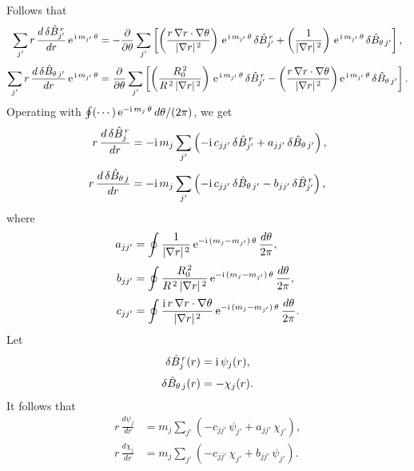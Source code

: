 \documentclass[notitlepage,12pt]{article}
\begin{document}
Follows that
\begin{align}
\sum_{j'} r\,\frac{d\,\delta \hat{B}^{\,r}_{j'}}{dr}\,{\rm e}^{\,{\rm i}\,m_{j'}\,\theta}&=-\frac{\partial}{\partial\theta}\sum_{j'} \left[\left(\frac{r\,\nabla r\cdot\nabla \theta}{|\nabla r|^{\,2}}\right)\,{\rm e}^{\,{\rm i}\,m_{j'}\,\theta}\,\delta \hat{B}^{\,r}_{j'} +\left(\frac{1}{|\nabla r|^{\,2}}\right)\,{\rm e}^{\,{\rm i}\,m_{j'}\,\theta}\,\delta \hat{B}_{\theta\,j'}\right],\\[0.5ex]
\sum_{j'} r\,\frac{d\,\delta \hat{B}_{\theta\,j'}}{dr}\,{\rm e}^{\,{\rm i}\,m_{j'}\,\theta}
&= \frac{\partial}{\partial\theta}\sum_{j'}\left[\left(\frac{R_0^{\,2}}{R^{\,2}\,|\nabla r|^{\,2}}\right)\,{\rm e}^{\,{\rm i}\,m_{j'}\,\theta}\,\delta \hat{B}^{\,r}_{j'}
-\left(\frac{r\,\nabla r\cdot\nabla\theta}{|\nabla r|^{\,2}}\right){\rm e}^{\,{\rm i}\,m_{j'}\,\theta}\,\delta \hat{B}_{\theta\,j'}\right].
\end{align}
Operating with $\oint(\cdots)\, {\rm e}^{-{\rm i}\,m_j\,\theta}\,d\theta/(2\pi)$, we
get
\begin{align}
r\,\frac{d\,\delta \hat{B}_j^{\,r}}{dr}
&= -{\rm i}\,m_j\sum_{j'}\left(-{\rm i}\,c_{jj'}\,\delta \hat{B}_{j'}^{\,r}
+a_{jj'}\,\delta \hat{B}_{\theta\,j'}\right),\\[0.5ex]
r\,\frac{d\,\delta \hat{B}_{\theta\,j}}{dr}
&= -{\rm i}\,m_j\sum_{j'}\left(-{\rm i}\,c_{jj'}\,\delta \hat{B}_{\theta\,j'}
-b_{jj'}\,\delta \hat{B}_{j'}^{\,r}\right),
\end{align}
where
\begin{align}
a_{jj'} &= \oint \frac{1}{|\nabla r|^{\,2}}\,
{\rm e}^{-{\rm i}\,(m_j-m_{j'})\,\theta}
\,\frac{d\theta}{2\pi},\\[0.5ex]
b_{jj'}& = \oint \frac{R_0^{\,2}}{R^{\,2}\,|\nabla r|^{\,2}}\,
{\rm e}^{-{\rm i}\,(m_j-m_{j'})\,\theta}
\,\frac{d\theta}{2\pi},\\[0.5ex]
c_{jj'} &= \oint \frac{{\rm i}\,r\,\nabla r\cdot\nabla \theta}{|\nabla r|^{\,2}}\,
{\rm e}^{-{\rm i}\,(m_j-m_{j'})\,\theta}
\,\frac{d\theta}{2\pi}.
\end{align}
Let
\begin{align}
\delta \hat{B}_{j}^{\,r}(r) &={\rm i}\,\psi_j(r),\\[0.5ex]
\delta \hat{B}_{\theta\,j}(r)&= -\chi_j(r).
\end{align}
It follows that
\begin{align}
r\,\frac{d\psi_j}{dr} &=m_j\sum_{j'}\left(-c_{jj'}\,\psi_{j'} + a_{jj'}\,\chi_{j'}\right),\\[0.5ex]
r\,\frac{d\chi_j}{dr} &=m_j\sum_{j'}\left(-c_{jj'}\,\chi_{j'} + b_{jj'}\,\psi_{j'}\right).
\end{align}
\end{document}
